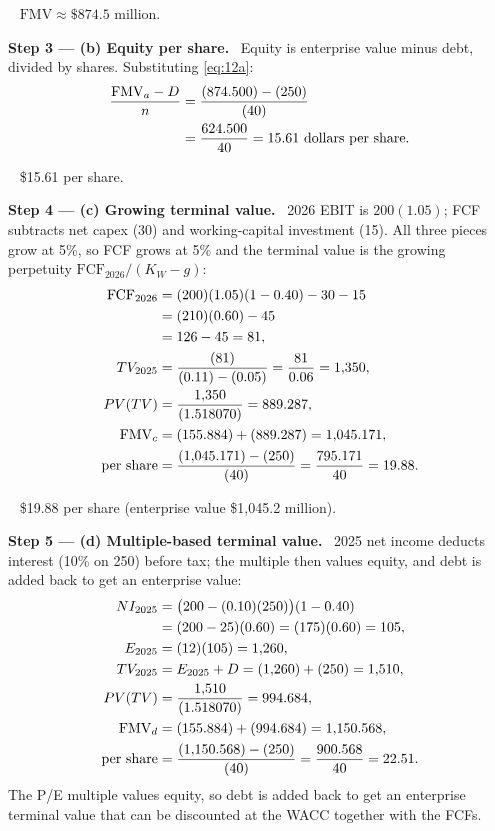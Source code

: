 \documentclass[11pt,a4paper]{article}
\numberwithin{equation}{section}
\newcommand{\step}[2]{\par\medskip\noindent\textbf{Step #1 --- #2.}~}
\newcommand{\answer}[1]{\par\smallskip\noindent\fbox{\textbf{Answer #1.}}~}
\begin{document}
\answer{(a)} $\mathrm{FMV}\approx\$874.5$ million.

\step{3}{(b) Equity per share} Equity is enterprise value minus debt, divided by shares.
Substituting \eqref{eq:12a}:
\begin{align}
  \frac{\mathrm{FMV}_a - D}{n} &= \frac{(874.500) - (250)}{(40)} \notag\\
                               &= \frac{624.500}{40} = 15.61 \text{ dollars per share}. \label{eq:12b}
\end{align}

\answer{(b)} \$15.61 per share.

\step{4}{(c) Growing terminal value} 2026 EBIT is $200(1.05)$; FCF subtracts net capex (30) and
working-capital investment (15). All three pieces grow at 5\%, so FCF grows at 5\% and the
terminal value is the growing perpetuity $\mathrm{FCF}_{2026}/(K_W-g)$:
\begin{align}
  \mathrm{FCF}_{2026} &= (200)(1.05)(1-0.40) - 30 - 15 \notag\\
                      &= (210)(0.60) - 45 \notag\\
                      &= 126 - 45 = 81, \notag\\
  TV_{2025} &= \frac{(81)}{(0.11)-(0.05)} = \frac{81}{0.06} = 1{,}350, \notag\\
  PV(TV) &= \frac{1{,}350}{(1.518070)} = 889.287, \notag\\
  \mathrm{FMV}_c &= (155.884) + (889.287) = 1{,}045.171, \notag\\
  \text{per share} &= \frac{(1{,}045.171) - (250)}{(40)} = \frac{795.171}{40} = 19.88. \label{eq:12c}
\end{align}

\answer{(c)} \$19.88 per share (enterprise value \$1{,}045.2 million).

\step{5}{(d) Multiple-based terminal value} 2025 net income deducts interest (10\% on 250) before
tax; the multiple then values equity, and debt is added back to get an enterprise value:
\begin{align}
  NI_{2025} &= \big(200 - (0.10)(250)\big)(1-0.40) \notag\\
            &= (200-25)(0.60) = (175)(0.60) = 105, \notag\\
  E_{2025} &= (12)(105) = 1{,}260, \notag\\
  TV_{2025} &= E_{2025} + D = (1{,}260) + (250) = 1{,}510, \notag\\
  PV(TV) &= \frac{1{,}510}{(1.518070)} = 994.684, \notag\\
  \mathrm{FMV}_d &= (155.884) + (994.684) = 1{,}150.568, \notag\\
  \text{per share} &= \frac{(1{,}150.568) - (250)}{(40)} = \frac{900.568}{40} = 22.51. \label{eq:12d}
\end{align}
The P/E multiple values equity, so debt is added back to get an enterprise terminal value that
can be discounted at the WACC together with the FCFs.
\end{document}

